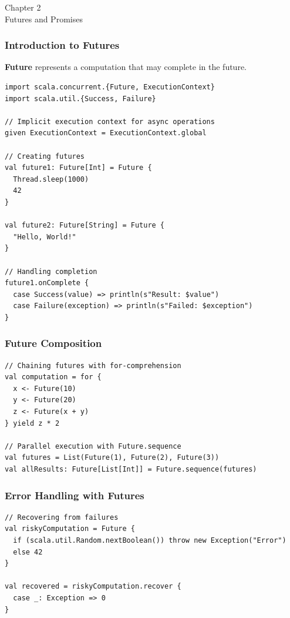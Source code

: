 \documentclass{beamer}
\newcommand{\chapterpage}[2]{
  \begin{frame}[plain]
    \centering
    \vfill
    {\usebeamerfont{title}\usebeamercolor[fg]{title}Chapter #1\\}
    \vspace{0.5cm}
    {\usebeamerfont{subtitle}#2}
    \vfill
  \end{frame}
}
\begin{document}
\chapterpage{2}{Futures and Promises}

\begin{frame}[fragile]
\frametitle{Introduction to Futures}

\textbf{Future} represents a computation that may complete in the future.

\begin{lstlisting}[style=scalaStyle]
import scala.concurrent.{Future, ExecutionContext}
import scala.util.{Success, Failure}

// Implicit execution context for async operations
given ExecutionContext = ExecutionContext.global

// Creating futures
val future1: Future[Int] = Future {
  Thread.sleep(1000)
  42
}

val future2: Future[String] = Future {
  "Hello, World!"
}

// Handling completion
future1.onComplete {
  case Success(value) => println(s"Result: $value")
  case Failure(exception) => println(s"Failed: $exception")
}
\end{lstlisting}

\end{frame}

\begin{frame}[fragile]
\frametitle{Future Composition}

\begin{lstlisting}[style=scalaStyle]
// Chaining futures with for-comprehension
val computation = for {
  x <- Future(10)
  y <- Future(20)
  z <- Future(x + y)
} yield z * 2

// Parallel execution with Future.sequence
val futures = List(Future(1), Future(2), Future(3))
val allResults: Future[List[Int]] = Future.sequence(futures)
\end{lstlisting}

\end{frame}

\begin{frame}[fragile]
\frametitle{Error Handling with Futures}

\begin{lstlisting}[style=scalaStyle]
// Recovering from failures
val riskyComputation = Future {
  if (scala.util.Random.nextBoolean()) throw new Exception("Error")
  else 42
}

val recovered = riskyComputation.recover {
  case _: Exception => 0
}
\end{lstlisting}

\end{frame}
\end{document}
